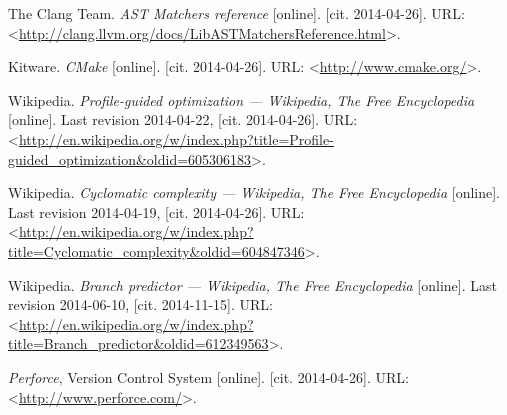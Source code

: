 \begin{thebibliography}{99}
	{\sc The Clang Team}.
	\emph{AST Matchers reference} [online].
	[cit. 2014-04-26].
	URL: <\url{http://clang.llvm.org/docs/LibASTMatchersReference.html}>.
	
	{\sc Kitware}.
	\emph{CMake} [online].
	[cit. 2014-04-26].
	URL: <\url{http://www.cmake.org/}>.
	
	{\sc Wikipedia}.
	\emph{Profile-guided optimization --- {W}ikipedia{,} The Free Encyclopedia} [online].
	Last revision 2014-04-22, [cit. 2014-04-26].
	URL: <\url{http://en.wikipedia.org/w/index.php?title=Profile-guided_optimization&oldid=605306183}>.	

	{\sc Wikipedia}.
	\emph{Cyclomatic complexity --- {W}ikipedia{,} The Free Encyclopedia} [online].
	Last revision 2014-04-19, [cit. 2014-04-26].
	URL: <\url{http://en.wikipedia.org/w/index.php?title=Cyclomatic_complexity&oldid=604847346}>.
	
	{\sc Wikipedia}.
	\emph{Branch predictor --- {W}ikipedia{,} The Free Encyclopedia} [online].
	Last revision 2014-06-10, [cit. 2014-11-15].
	URL: <\url{http://en.wikipedia.org/w/index.php?title=Branch_predictor&oldid=612349563}>.
	
	\emph{Perforce}, Version Control System [online].
	[cit. 2014-04-26].
	URL: <\url{http://www.perforce.com/}>.
	
\end{thebibliography}
